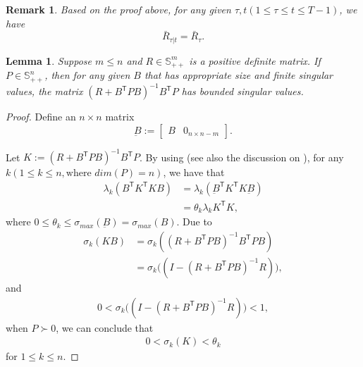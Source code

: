 \documentclass{article}
\newcommand{\transpose}{\mathsf{T}}
\newtheorem{lemma}{Lemma}
\newtheorem{remark}{Remark}
\begin{document}
\begin{remark}
    Based on the proof above, for any given $\tau,t(1\leq \tau \leq t \leq T-1)$, we have
    \begin{equation*}
        \bar{R}_{\tau|t} = \bar{R}_{\tau}.
    \end{equation*}
\end{remark}

\begin{lemma}\label{lemma:matrixK}
    Suppose $m \leq n$ and $R\in \mathbb{S}^{m}_{++}$ is a positive definite matrix. 
    If $P\in \mathbb{S}^{n}_{++}$, then for any given $B$ that has appropriate size and finite singular values, the matrix $(R+B^{\transpose}PB)^{-1}B^{\transpose}P$ has bounded singular values.
\end{lemma}
\begin{proof}
    Define an $n\times n$ matrix
    \begin{equation}
        \underbar{B} := 
        \begin{bmatrix}
            B & 0_{n\times n-m}
        \end{bmatrix}.
    \end{equation}
    
    Let $K := (R+B^{\transpose}PB)^{-1}B^{\transpose}P$. By using \cite[Theorem 4.5.9]{horn_matrix_2013} (see also the discussion on \cite[p.~284]{horn_matrix_2013}), for any $k(1\leq k\leq n,\text{where $dim(P)=n$})$, we have that
    \begin{align*}
        \lambda_{k}(B^{\transpose}K^{\transpose}KB) &= \lambda_{k}(\underbar{B}^{\transpose}K^{\transpose}K\underbar{B})\\
        &= \theta_{k}\lambda_{k}{K^{\transpose}K},
    \end{align*}
    where $0\leq \theta_{k} \leq \sigma_{max}(\underbar{B})=\sigma_{max}(B)$.
    Due to
    \begin{align*}
        \sigma_{k}(KB) &= \sigma_{k}((R+B^{\transpose}PB)^{-1}B^{\transpose}PB)\\
        &= \sigma_{k}\bigg((I - (R+B^{\transpose}PB)^{-1}R) \bigg),
    \end{align*}
    and
    \begin{align*}
       0 < \sigma_{k}\bigg((I - (R+B^{\transpose}PB)^{-1}R) \bigg) < 1,
    \end{align*}
    when $P \succ 0$, we can conclude that
    \begin{align}
        0 < \sigma_{k}(K) < \theta_{k}
    \end{align}
    for $1\leq k \leq n$.
\end{proof}
\end{document}
